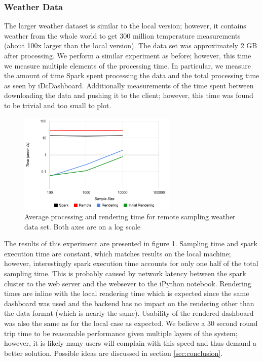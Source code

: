 \documentclass[letter,twocolumn]{article}
\begin{document}
\subsubsection{Weather Data}

The larger weather dataset is similar to the local version; however, it contains weather from the whole world to get 300 million temperature measurements (about 100x larger than the local version).  
The data set was approximately 2 GB after processing.
We perform a similar experiment as before; however, this time we measure multiple elements of the processing time.
In particular, we measure the amount of time Spark spent processing the data and the total processing time as seen by iDcDashboard.
Additionally measurements of the time spent between downloading the data and pushing it to the client; however, this time was found to be trivial and too small to plot.

\begin{figure}
\begin{center}
\includegraphics[width=3in]{figs/weather_big_perf.png}
\end{center}
\caption{Average processing and rendering time for remote sampling weather data set.  Both axes are on a log scale}\label{fig:weather_big_perf}
\end{figure}

The results of this experiment are presented in figure \ref{fig:weather_big_perf}.
Sampling time and spark execution time are constant, which matches results on the local machine;
however, interestingly spark execution time accounts for only one half of the total sampling time.  
This is probably caused by network latency between the spark cluster to the web server and the websever to the iPython notebook.
Rendering times are inline with the local rendering time which is expected since the same dashboard was used and the backend has no impact on the rendering other than the data format (which is nearly the same).
Usability of the rendered dashboard was also the same as for the local case as expected.
We believe a 30 second round trip time to be reasonable performance given multiple layers of the system; however, it is likely many users will complain with this speed and thus demand a better solution.
Possible ideas are discussed in section \ref{sec:conclusion}.
\end{document}
